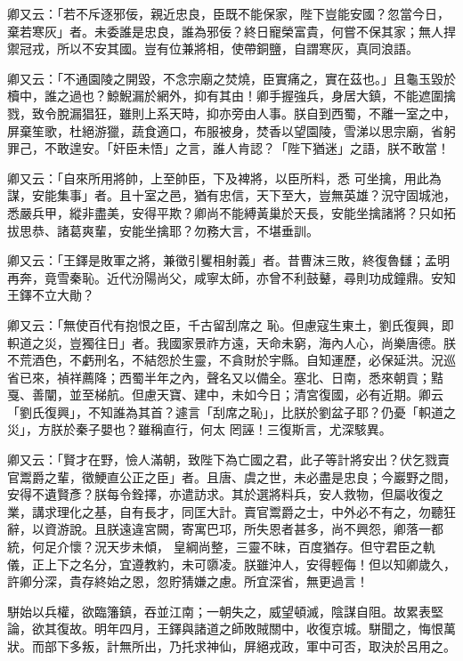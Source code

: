 \begin{pinyinscope}
 卿又云：「若不斥逐邪佞，親近忠良，臣既不能保家，陛下豈能安國？忽當今日，棄若寒灰」者。未委誰是忠良，誰為邪佞？終日寵榮富貴，何嘗不保其家；無人捍禦冠戎，所以不安其國。豈有位兼將相，使帶銅鹽，自謂寒灰，真同浪語。



 卿又云：「不通園陵之開毀，不念宗廟之焚燒，臣實痛之，實在茲也。」且龜玉毀於櫝中，誰之過也？鯨鯢漏於網外，抑有其由！卿手握強兵，身居大鎮，不能遮圍擒戮，致令脫漏猖狂，雖則上系天時，抑亦旁由人事。朕自到西蜀，不離一室之中，屏棄笙歌，杜絕游獵，蔬食適口，布服被身，焚香以望園陵，雪涕以思宗廟，省躬罪己，不敢遑安。「奸臣未悟」之言，誰人肯認？「陛下猶迷」之語，朕不敢當！



 卿又云：「自來所用將帥，上至帥臣，下及裨將，以臣所料，悉
 可坐擒，用此為謀，安能集事」者。且十室之邑，猶有忠信，天下至大，豈無英雄？況守固城池，悉嚴兵甲，縱非盡美，安得平欺？卿尚不能縛黃巢於天長，安能坐擒諸將？只如拓拔思恭、諸葛爽輩，安能坐擒耶？勿務大言，不堪垂訓。



 卿又云：「王鐸是敗軍之將，兼徵引矍相射義」者。昔曹沫三敗，終復魯讎；孟明再奔，竟雪秦恥。近代汾陽尚父，咸寧太師，亦曾不利鼓鼙，尋則功成鐘鼎。安知王鐸不立大勛？



 卿又云：「無使百代有抱恨之臣，千古留刮席之
 恥。但慮寇生東土，劉氏復興，即軹道之災，豈獨往日」者。我國家景祚方遠，天命未窮，海內人心，尚樂唐德。朕不荒酒色，不虧刑名，不結怨於生靈，不貪財於宇縣。自知運歷，必保延洪。況巡省已來，禎祥薦降；西蜀半年之內，聲名又以備全。塞北、日南，悉來朝貢；黠戛、善闡，並至梯航。但慮天寶、建中，未如今日；清宮復國，必有近期。卿云「劉氏復興」，不知誰為其首？遽言「刮席之恥」，比朕於劉盆子耶？仍憂「軹道之災」，方朕於秦子嬰也？雖稱直行，何太
 罔誣！三復斯言，尤深駭異。



 卿又云：「賢才在野，憸人滿朝，致陛下為亡國之君，此子等計將安出？伏乞戮賣官鬻爵之輩，徵鯁直公正之臣」者。且唐、虞之世，未必盡是忠良；今巖野之間，安得不遺賢彥？朕每令銓擇，亦遣訪求。其於選將料兵，安人救物，但屬收復之業，講求理化之基，自有長才，同匡大計。賣官鬻爵之士，中外必不有之，勿聽狂辭，以資游說。且朕遠違宮闕，寄寓巴邛，所失恩者甚多，尚不興怨，卿落一都統，何足介懷？況天步未傾，
 皇綱尚整，三靈不昧，百度猶存。但守君臣之軌儀，正上下之名分，宜遵教約，未可隳凌。朕雖沖人，安得輕侮！但以知卿歲久，許卿分深，貴存終始之恩，忽貯猜嫌之慮。所宜深省，無更過言！



 駢始以兵權，欲臨籓鎮，吞並江南；一朝失之，威望頓滅，陰謀自阻。故累表堅論，欲其復故。明年四月，王鐸與諸道之師敗賊關中，收復京城。駢聞之，悔恨萬狀。而部下多叛，計無所出，乃托求神仙，屏絕戎政，軍中可否，取決於呂用之。




\end{pinyinscope}
